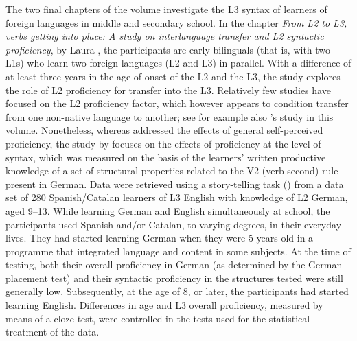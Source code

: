 \documentclass[output=paper,colorlinks,citecolor=brown,nonflat]{langsci/langscibook}
\begin{document}
The two final chapters of the volume investigate the L3 syntax of learners of foreign languages in middle and secondary school. In the chapter \textit{From L2 to L3, verbs getting into place: A study on interlanguage transfer and L2 syntactic proficiency}, by Laura \citeauthor{chapters/sanchez7}, the participants are early bilinguals (that is, with two L1s) who learn two foreign languages (L2 and L3) in parallel. With a difference of at least three years in the age of onset of the L2 and the L3, the study explores the role of L2 proficiency for transfer into the L3. Relatively few studies have focused on the L2 proficiency factor, which however appears to condition transfer from one non-native language to another; see for example also \citeauthor{chapters/sciutti}’s study in this volume. Nonetheless, whereas \citeauthor{chapters/sciutti} addressed the effects of general self-perceived proficiency, the study by \citeauthor{chapters/sanchez7} focuses on the effects of proficiency at the level of syntax, which was measured on the basis of the learners’ written productive knowledge of a set of structural properties related to the V2 (verb second) rule present in German. Data were retrieved using a story-telling task (\citealt{SánchezJarvis2008}) from a data set of 280 Spanish/Catalan learners of L3 English with knowledge of L2 German, aged 9--13. While learning German and English simultaneously at school, the participants used Spanish and/or Catalan, to varying degrees, in their everyday lives. They had started learning German when they were 5 years old in a programme that integrated language and content in some subjects. At the time of testing, both their overall proficiency in German (as determined by the German placement test) and their syntactic proficiency in the structures tested were still generally low. Subsequently, at the age of 8, or later, the participants had started learning English. Differences in age and L3 overall proficiency, measured by means of a cloze test, were controlled in the tests used for the statistical treatment of the data.
\end{document}

